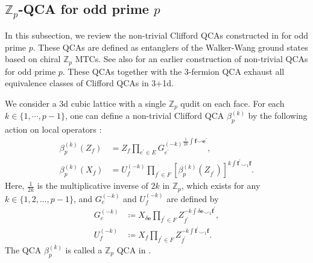 \documentclass[aps,twocolumn,prx,floatfix,preprintnumbers, nofootinbib,10pt]{revtex4-2}
\numberwithin{equation}{section}
\theoremstyle{definition}
\theoremstyle{remark}
\theoremstyle{claim}
\begin{document}
\subsection{$\mathbb{Z}_p$-QCA for odd prime $p$}
\label{sec: Zpk QCA}
In this subsection, we review the non-trivial Clifford QCAs constructed in \cite{MengSun2026} for odd prime $p$.
These QCAs are defined as entanglers of the Walker-Wang ground states based on chiral $\mathbb{Z}_p$ MTCs.
See also \cite{Haah_2021} for an earlier construction of non-trivial QCAs for odd prime $p$.
These QCAs together with the 3-fermion QCA exhaust all equivalence classes of Clifford QCAs \cite{Haah:2022yyo} in 3+1d.

We consider a 3d cubic lattice with a single $\mathbb{Z}_p$ qudit on each face.
For each $k \in \{1, \cdots, p-1\}$, one can define a non-trivial Clifford QCA $\beta_p^{(k)}$ by the following action on local operators \cite{MengSun2026}:
\begin{align}
\beta_p^{(k)}(Z_f) &= Z_f \prod_{e^{\prime} \in E} \left. G_{e^{\prime}}^{(-k)} \right.^{\frac{1}{2k} \int \bm{f} \smile \bm{e}^{\prime}},
\label{eq: beta pk Z}
\\
\beta_p^{(k)}(X_f) &= U_f^{(-k)} \prod_{f^{\prime} \in F} \left[\beta_p^{(k)}(Z_{f^{\prime}})\right]^{k \int \bm{f}^{\prime} \smile_1 \bm{f}}.
\label{eq: beta pk X}
\end{align}
Here, $\frac{1}{2k}$ is the multiplicative inverse of $2k$ in $\mathbb{Z}_p$, which exists for any $k \in \{ 1, 2, \ldots, p - 1 \}$, and $G_e^{(-k)}$ and $U_f^{(-k)}$ are defined by \cite{MengSun2026}
\begin{align}
G_e^{(-k)} &\coloneq X_{\delta \bm{e}} \prod_{f^{\prime} \in F} Z_{f^{\prime}}^{-k \int \delta \bm{e} \smile_1 \bm{f}^{\prime}}, 
\label{eq: Gek}
\\
U_f^{(-k)} &\coloneq X_f \prod_{f^{\prime} \in F} Z_{f^{\prime}}^{-k \int \bm{f}^{\prime} \smile_1 \bm{f}}.
\label{eq: Ufk}
\end{align}
The QCA $\beta_p^{(k)}$ is called a $\mathbb{Z}_p$ QCA in \cite{MengSun2026}.
\end{document}
